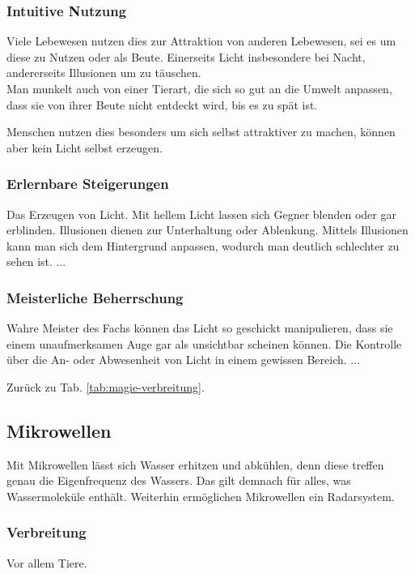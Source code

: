 \subsubsection{Intuitive Nutzung}
Viele Lebewesen nutzen dies zur Attraktion von anderen Lebewesen, sei es um diese zu Nutzen oder als Beute. Einerseits Licht insbesondere bei Nacht, andererseits Illusionen um zu täuschen. \\
Man munkelt auch von einer Tierart, die sich so gut an die Umwelt anpassen, dass sie von ihrer Beute nicht entdeckt wird, bis es zu spät ist. 

Menschen nutzen dies besonders um sich selbst attraktiver zu machen, können aber kein Licht selbst erzeugen.

\subsubsection{Erlernbare Steigerungen}
\begin{outline}
	\1 Das Erzeugen von Licht.
	\1 Mit hellem Licht lassen sich Gegner blenden oder gar erblinden.
	\1 Illusionen dienen zur Unterhaltung oder Ablenkung.
	\1 Mittels Illusionen kann man sich dem Hintergrund anpassen, wodurch man deutlich schlechter zu sehen ist.
	\1 ...
\end{outline}

\subsubsection{Meisterliche Beherrschung} 
\begin{outline}
	\1 Wahre Meister des Fachs können das Licht so geschickt manipulieren, dass sie einem unaufmerksamen Auge gar als unsichtbar scheinen können.
	\1 Die Kontrolle über die An- oder Abwesenheit von Licht in einem gewissen Bereich.
	\1 ...
\end{outline}
Zurück zu Tab. \ref{tab:magie-verbreitung}.



\subsection{Mikrowellen}\label{magie:mikrowelle}
Mit Mikrowellen lässt sich Wasser erhitzen und abkühlen, denn diese treffen genau die Eigenfrequenz des Wassers.
Das gilt demnach für alles, was Wassermoleküle enthält.
Weiterhin ermöglichen Mikrowellen ein Radarsystem.

\subsubsection{Verbreitung}
Vor allem Tiere.

